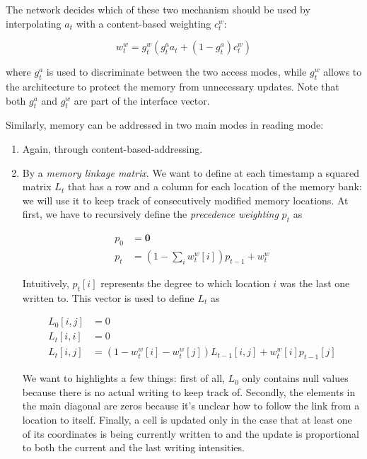 \documentclass{article}
\begin{document}
The network decides which of these two mechanism should be used by interpolating $a_t$ with a content-based weighting $c_t^w$:

\begin{equation}
    w_t^w = g_t^w(g_t^a a_t + (1-g_t^a)c_t^w)
\end{equation}

where $g_t^a$ is used to discriminate between the two access modes, while $g_t^w$ allows to the architecture to protect the memory from unnecessary updates. Note that both $g_t^a$ and $g_t^w$ are part of the interface vector.

Similarly, memory can be addressed in two main modes in reading mode:

\begin{enumerate}
    \item Again, through content-based-addressing.
    \item By a \textit{memory linkage matrix}. We want to define at each timestamp a squared matrix $L_t$ that has a row and a column for each location of the memory bank: we will use it to keep track of consecutively modified memory locations. At first, we have to recursively define the \textit{precedence weighting} $p_t$ as

    \begin{align}
        p_0 &= \mathbf{0}\\
        p_t &= ( 1 - \sum_i w_t^w[i] ) p_{t-1} + w_t^w
    \end{align}

    Intuitively, $p_t[i]$ represents the degree to which location $i$ was the last one written to. This vector is used to define $L_t$ as

    \begin{align}
        L_0[i,j] &= 0\\
        L_t[i,i] &= 0\\
        L_t[i,j] &= (1-w_t^w[i]-w_t^w[j])L_{t-1}[i,j]+w_t^w[i]p_{t-1}[j]
    \end{align}

    We want to highlights a few things: first of all, $L_0$ only contains null values because there is no actual writing to keep track of. Secondly, the elements in the main diagonal are zeros because it's unclear how to follow the link from a location to itself. Finally, a cell is updated only in the case that at least one of its coordinates is being currently written to and the update is proportional to both the current and the last writing intensities. 


\end{enumerate}
\end{document}
